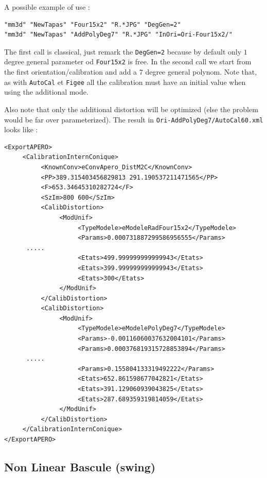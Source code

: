 A possible example of use :

\begin{verbatim}
"mm3d" "NewTapas" "Four15x2" "R.*JPG" "DegGen=2"
"mm3d" "NewTapas" "AddPolyDeg7" "R.*JPG" "InOri=Ori-Four15x2/"
\end{verbatim}

The first call is classical, just remark the {\tt DegGen=2} because by default only $1$ degree
general parameter od {\tt Four15x2} is free.  In the second call we start from the first orientation/calibration
and add a $7$ degree general polynom. Note that, as with {\tt AutoCal} et {\tt Figee} all the calibration must have
an initial value when using the additional mode.

Also note that only the additional distortion will be optimized (else the problem would be far over parameterized).
The result in {\tt Ori-AddPolyDeg7/AutoCal60.xml} looks like :

{\tiny
\begin{verbatim}
<ExportAPERO>
     <CalibrationInternConique>
          <KnownConv>eConvApero_DistM2C</KnownConv>
          <PP>389.315403456829813 291.190537211471565</PP>
          <F>653.34645310282724</F>
          <SzIm>800 600</SzIm>
          <CalibDistortion>
               <ModUnif>
                    <TypeModele>eModeleRadFour15x2</TypeModele>
                    <Params>0.000731887299586956555</Params>
      .....
                    <Etats>499.999999999999943</Etats>
                    <Etats>399.999999999999943</Etats>
                    <Etats>300</Etats>
               </ModUnif>
          </CalibDistortion>
          <CalibDistortion>
               <ModUnif>
                    <TypeModele>eModelePolyDeg7</TypeModele>
                    <Params>-0.00116060037632004101</Params>
                    <Params>0.000376819315728853894</Params>
      .....
                    <Params>0.155804133319492222</Params>
                    <Etats>652.861598677042821</Etats>
                    <Etats>391.129060939043825</Etats>
                    <Etats>287.689359319814059</Etats>
               </ModUnif>
          </CalibDistortion>
     </CalibrationInternConique>
</ExportAPERO>

\end{verbatim}
}


\subsection{Non Linear Bascule (swing)}

